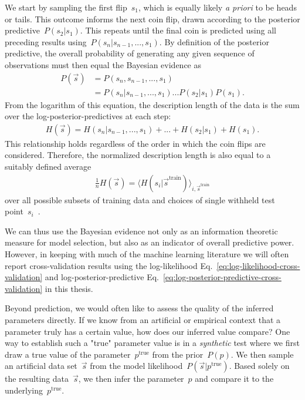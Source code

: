 We start by sampling the first flip~$s_1$, which is equally likely \textit{a priori} to be heads or tails. This outcome informs the next coin flip, drawn according to the posterior predictive~$P(s_2|s_1)$. This repeats until the final coin is predicted using all preceding results using~$P(s_n|s_{n-1},...,s_1)$. By definition of the posterior predictive, the overall probability of generating any given sequence of observations must then equal the Bayesian evidence as
\begin{align}
    P(\vec{s}) &= P(s_n,s_{n-1},...,s_1) \nonumber \\
    &= P(s_n|s_{n-1},...,s_1)...P(s_2|s_1)P(s_1).
\end{align}
From the logarithm of this equation, the description length of the data is the sum over the log-posterior-predictives at each step: \begin{align}
    H(\vec{s}) = H(s_n|s_{n-1},...,s_1) + ... + H(s_2|s_1) + H(s_1).
\end{align}
This relationship holds regardless of the order in which the coin flips are considered. Therefore, the normalized description length is also equal to a suitably defined average \begin{align}
    \frac{1}{n}H(\vec{s}) = \langle H(s_i|\vec{s}^{\text{train}})\rangle_{i,\vec{s}^{\text{train}}}
\end{align}
over all possible subsets of training data and choices of single withheld test point~$s_i$~\cite{FH20}.

We can thus use the Bayesian evidence not only as an information theoretic measure for model selection, but also as an indicator of overall predictive power. However, in keeping with much of the machine learning literature we will often report cross-validation results using the log-likelihood Eq.~\eqref{eq:log-likelihood-cross-validation} and log-posterior-predictive Eq.~\eqref{eq:log-posterior-predictive-cross-validation} in this thesis.

Beyond prediction, we would often like to assess the quality of the inferred parameters directly. If we know from an artificial or empirical context that a parameter truly has a certain value, how does our inferred value compare? One way to establish such a "true" parameter value is in a \emph{synthetic} test where we first draw a true value of the parameter~$p^{\text{true}}$ from the prior~$P(p)$. We then sample an artificial data set~$\vec{s}$ from the model likelihood~$P(\vec{s}|p^{\text{true}})$. Based solely on the resulting data~$\vec{s}$, we then infer the parameter~$p$ and compare it to the underlying~$p^{\text{true}}$. 

